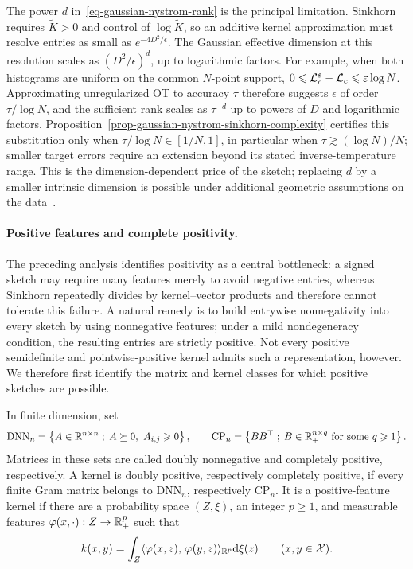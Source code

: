 The power \(d\) in~\eqref{eq-gaussian-nystrom-rank} is the principal limitation. Sinkhorn requires \(\widetilde K>0\) and control of \(\log\widetilde K\), so an additive kernel approximation must resolve entries as small as \(e^{-4D^2/\epsilon}\). The Gaussian effective dimension at this resolution scales as \((D^2/\epsilon)^d\), up to logarithmic factors. For example, when both histograms are uniform on the common \(N\)-point support, \(0\leqslant\mathcal{L}_c^\varepsilon-\mathcal{L}_c\leqslant\varepsilon\log N\). Approximating unregularized OT to accuracy \(\tau\) therefore suggests \(\epsilon\) of order \(\tau/\log N\), and the sufficient rank scales as \(\tau^{-d}\) up to powers of \(D\) and logarithmic factors. Proposition~\ref{prop-gaussian-nystrom-sinkhorn-complexity} certifies this substitution only when $\tau/\log N\in[1/N,1]$, in particular when $\tau\gtrsim(\log N)/N$; smaller target errors require an extension beyond its stated inverse-temperature range. This is the dimension-dependent price of the sketch; replacing \(d\) by a smaller intrinsic dimension is possible under additional geometric assumptions on the data~\cite{AltschulerBachRudiNilesWeed2019NystromSinkhorn}.

\paragraph{Positive features and complete positivity.}
The preceding analysis identifies positivity as a central bottleneck: a signed sketch may require many features merely to avoid negative entries, whereas Sinkhorn repeatedly divides by kernel--vector products and therefore cannot tolerate this failure. A natural remedy is to build entrywise nonnegativity into every sketch by using nonnegative features; under a mild nondegeneracy condition, the resulting entries are strictly positive. Not every positive semidefinite and pointwise-positive kernel admits such a representation, however. We therefore first identify the matrix and kernel classes for which positive sketches are possible.
\begin{defn}\label{def-dnn-cp-kernels}
In finite dimension, set
\[
	\mathrm{DNN}_n=\left\{ A\in\mathbb{R}^{n\times n} \;;\; A\succeq0,\ A_{i,j}\geqslant0 \right\},
	\qquad
	\mathrm{CP}_n=\left\{ BB^\top \;;\; B\in\mathbb{R}_+^{n\times q}\hbox{ for some }q\geqslant1 \right\}.
\]
Matrices in these sets are called doubly nonnegative and completely positive, respectively. A kernel is doubly positive, respectively completely positive, if every finite Gram matrix belongs to \(\mathrm{DNN}_n\), respectively \(\mathrm{CP}_n\).
It is a positive-feature kernel if there are a probability space \((Z,\xi)\), an integer \(p\geq1\), and measurable features \(\varphi(x,\cdot):Z\to\mathbb{R}_+^p\) such that
\[
k(x,y)=\int_Z\langle \varphi(x,z),\,\varphi(y,z)\rangle_{\mathbb{R}^p}\mathrm{d}\xi(z)
\qquad (x,y\in\mathcal{X}).
\]
\end{defn}

